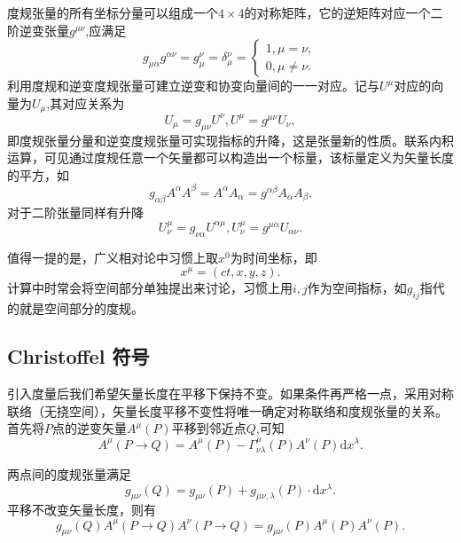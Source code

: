 \documentclass[11pt, a4paper, oneside, onecolumn]{ctexart}
\numberwithin{equation}{subsection}
\begin{document}
度规张量的所有坐标分量可以组成一个$4\times4$的对称矩阵，它的逆矩阵对应一个二阶逆变张量$g^{\mu\nu}$,应满足
\begin{equation}
g_{\mu\alpha}g^{\alpha\nu}=g^{\nu}_{\mu}=\delta{}_{\mu}^{\nu}=
\begin{cases}
1,\mu=\nu,\\
0,\mu\ne\nu.
\end{cases}
\end{equation}
利用度规和逆变度规张量可建立逆变和协变向量间的一一对应。记与$U^{\mu}$对应的向量为$U_{\mu}$,其对应关系为
\begin{equation}
U_{\mu}=g_{\mu\nu}U^{\nu},U^{\mu}=g^{\mu\nu}U_{\nu},
\end{equation}
即度规张量分量和逆变度规张量可实现指标的升降，这是张量新的性质。联系内积运算，可见通过度规任意一个矢量都可以构造出一个标量，该标量定义为矢量长度的平方，如
\begin{equation}
g_{\alpha\beta}A^{\alpha}A^{\beta}=A^{\alpha}A_{\alpha}=g^{\alpha\beta}A_{\alpha}A_{\beta}.
\end{equation}
对于二阶张量同样有升降
\begin{equation}
U_{\nu}^{\mu}=g_{\nu\alpha}U^{\alpha\mu},U_{\nu}^{\mu}=g^{\mu\alpha}U_{\alpha\nu}.
\end{equation}

值得一提的是，广义相对论中习惯上取$x^{0}$为时间坐标，即
\begin{equation}
x^{\mu}=\left(ct,x,y,z\right).
\end{equation}
计算中时常会将空间部分单独提出来讨论，习惯上用$i,j$作为空间指标，如$g_{ij}$指代的就是空间部分的度规。

\subsection{Christoffel 符号}
引入度量后我们希望矢量长度在平移下保持不变。如果条件再严格一点，采用对称联络（无挠空间），矢量长度平移不变性将唯一确定对称联络和度规张量的关系。首先将$P$点的逆变矢量$A^{\mu}\left(P\right)$平移到邻近点$Q$,可知
\begin{equation}
A^{\mu}\left(P\to Q\right)=A^{\mu}\left(P\right)-\Gamma_{\nu\lambda}^{\mu}\left(P\right)A^{\nu}\left(P\right)\mathrm{d}x^{\lambda}.\label{1.7.1}
\end{equation}

两点间的度规张量满足
\begin{equation}
g_{\mu\nu}\left(Q\right)=g_{\mu\nu}\left(P\right)+g_{\mu\nu,\lambda}\left(P\right)\cdot\mathrm{d}x^{\lambda}.\label{1.7.2}
\end{equation}
平移不改变矢量长度，则有
\begin{equation}
g_{\mu\nu}\left(Q\right)A^{\mu}\left(P\to Q\right)A^{\nu}\left(P\to Q\right)=g_{\mu\nu}\left(P\right)A^{\mu}\left(P\right)A^{\nu}\left(P\right).\label{1.7.3}
\end{equation}
\end{document}

